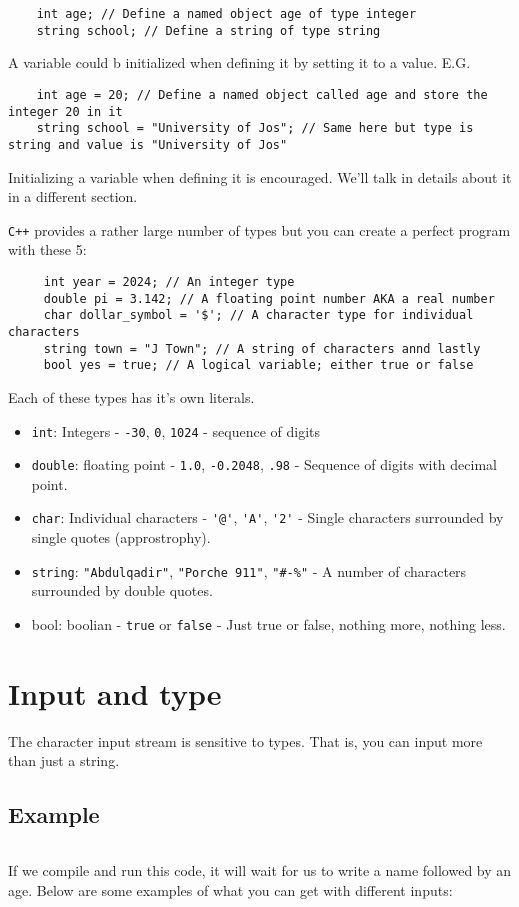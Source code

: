 \documentclass{book}
\begin{document}
\begin{verbatim}
	int age; // Define a named object age of type integer
	string school; // Define a string of type string
\end{verbatim}

A variable could b initialized when defining it by setting it to a value. E.G.

\begin{verbatim}
	int age = 20; // Define a named object called age and store the integer 20 in it
	string school = "University of Jos"; // Same here but type is string and value is "University of Jos"
\end{verbatim}

Initializing a variable when defining it is encouraged. We'll talk in details about it in a different section.


\verb|C++| provides a rather large number of types but you can create a perfect program with these 5:

\begin{verbatim}
	 int year = 2024; // An integer type
	 double pi = 3.142; // A floating point number AKA a real number
	 char dollar_symbol = '$'; // A character type for individual characters
	 string town = "J Town"; // A string of characters annd lastly
	 bool yes = true; // A logical variable; either true or false
\end{verbatim}

Each of these types has it's own literals.

\begin{itemize}
	\item \verb|int|: Integers {-} \verb|-30|, \verb|0|, \verb|1024| {-} sequence of digits
	\item \verb|double|: floating point {-} \verb|1.0|, \verb|-0.2048|, \verb|.98| {-} Sequence of digits with decimal point.
	\item \verb|char|: Individual characters {-} \verb|'@'|, \verb|'A'|, \verb|'2'| {-} Single characters surrounded by single quotes (approstrophy).
	\item \verb|string|: \verb|"Abdulqadir"|, \verb|"Porche 911"|, \verb|"#-%"| {-} A number of characters surrounded by double quotes.
	\item bool: boolian {-} \verb|true| or \verb|false| {-} Just true or false, nothing more, nothing less.
\end{itemize}

\section{Input and type}
The character input stream is sensitive to types. That is, you can input more than just a string.

\subsection*{Example}

\inputminted{c++}{./csc-201/4-read_name_and_age.cpp}

If we compile and run this code, it will wait for us to write a name followed by an age. Below are some examples of what you can get with different inputs:
\end{document}
